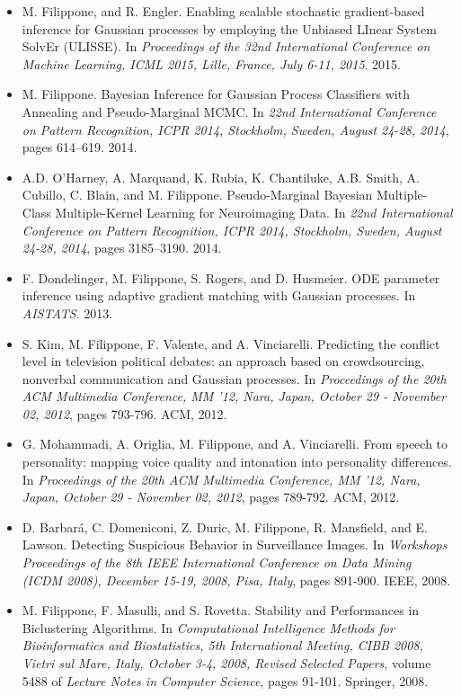\begin{itemize}
\item  M. Filippone, and R. Engler. Enabling scalable stochastic gradient-based inference for {G}aussian processes by employing the {U}nbiased {LI}near {S}ystem {S}olv{E}r ({ULISSE}). In \emph{Proceedings of the 32nd International Conference on Machine Learning, ICML 2015, Lille, France, July 6-11, 2015}. 2015.
\item  M. Filippone. Bayesian Inference for {G}aussian Process Classifiers with Annealing and Pseudo-Marginal {MCMC}. In \emph{22nd International Conference on Pattern Recognition, {ICPR} 2014, Stockholm, Sweden, August 24-28, 2014}, pages 614--619. 2014.
\item  A.D. O'Harney, A. Marquand, K. Rubia, K. Chantiluke, A.B. Smith, A. Cubillo, C. Blain, and M. Filippone. Pseudo-Marginal {B}ayesian Multiple-Class Multiple-Kernel Learning for Neuroimaging Data. In \emph{22nd International Conference on Pattern Recognition, {ICPR} 2014, Stockholm, Sweden, August 24-28, 2014}, pages 3185--3190. 2014.
\item  F. Dondelinger, M. Filippone, S. Rogers, and D. Husmeier. {ODE} parameter inference using adaptive gradient matching with {G}aussian processes. In \emph{AISTATS}. 2013.
\item  S. Kim, M. Filippone, F. Valente, and A. Vinciarelli. Predicting the conflict level in television political debates: an approach based on crowdsourcing, nonverbal communication and {G}aussian processes. In \emph{Proceedings of the 20th ACM Multimedia Conference, MM '12, Nara, Japan, October 29 - November 02, 2012}, pages 793-796. ACM, 2012.
\item  G. Mohammadi, A. Origlia, M. Filippone, and A. Vinciarelli. From speech to personality: mapping voice quality and intonation into personality differences. In \emph{Proceedings of the 20th ACM Multimedia Conference, MM '12, Nara, Japan, October 29 - November 02, 2012}, pages 789-792. ACM, 2012.
\item  D. Barbar{\'a}, C. Domeniconi, Z. Duric, M. Filippone, R. Mansfield, and E. Lawson. Detecting Suspicious Behavior in Surveillance Images. In \emph{Workshops Proceedings of the 8th IEEE International Conference on Data Mining (ICDM 2008), December 15-19, 2008, Pisa, Italy}, pages 891-900. IEEE, 2008.
\item  M. Filippone, F. Masulli, and S. Rovetta. Stability and Performances in Biclustering Algorithms. In \emph{Computational Intelligence Methods for Bioinformatics and Biostatistics, 5th International Meeting, CIBB 2008, Vietri sul Mare, Italy, October 3-4, 2008, Revised Selected Papers}, volume 5488 of \emph{Lecture Notes in Computer Science}, pages 91-101. Springer, 2008.

\end{itemize}
